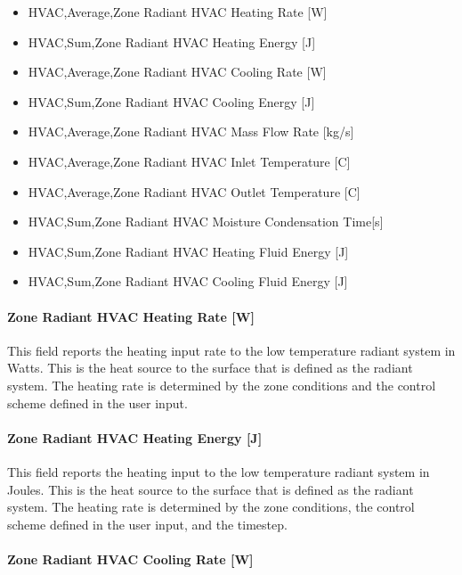 \begin{itemize}
\item
  HVAC,Average,Zone Radiant HVAC Heating Rate {[}W{]}
\item
  HVAC,Sum,Zone Radiant HVAC Heating Energy {[}J{]}
\item
  HVAC,Average,Zone Radiant HVAC Cooling Rate {[}W{]}
\item
  HVAC,Sum,Zone Radiant HVAC Cooling Energy {[}J{]}
\item
  HVAC,Average,Zone Radiant HVAC Mass Flow Rate {[}kg/s{]}
\item
  HVAC,Average,Zone Radiant HVAC Inlet Temperature {[}C{]}
\item
  HVAC,Average,Zone Radiant HVAC Outlet Temperature {[}C{]}
\item
  HVAC,Sum,Zone Radiant HVAC Moisture Condensation Time{[}s{]}
\item
  HVAC,Sum,Zone Radiant HVAC Heating Fluid Energy {[}J{]}
\item
  HVAC,Sum,Zone Radiant HVAC Cooling Fluid Energy {[}J{]}
\end{itemize}

\paragraph{Zone Radiant HVAC Heating Rate {[}W{]}}\label{zone-radiant-hvac-heating-rate-w}

This field reports the heating input rate to the low temperature radiant system in Watts. This is the heat source to the surface that is defined as the radiant system. The heating rate is determined by the zone conditions and the control scheme defined in the user input.

\paragraph{Zone Radiant HVAC Heating Energy {[}J{]}}\label{zone-radiant-hvac-heating-energy-j}

This field reports the heating input to the low temperature radiant system in Joules. This is the heat source to the surface that is defined as the radiant system. The heating rate is determined by the zone conditions, the control scheme defined in the user input, and the timestep.

\paragraph{Zone Radiant HVAC Cooling Rate {[}W{]}}\label{zone-radiant-hvac-cooling-rate-w}

